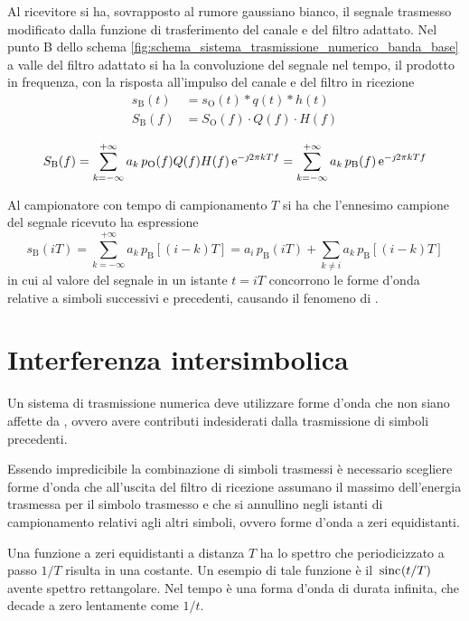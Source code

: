 Al ricevitore si ha, sovrapposto al rumore gaussiano bianco, il segnale trasmesso modificato dalla funzione di trasferimento del canale e del filtro adattato. Nel punto B dello schema \ref{fig:schema_sistema_trasmissione_numerico_banda_base} a valle del filtro adattato si ha la convoluzione del segnale nel tempo, il prodotto in frequenza, con la risposta all'impulso del canale e del filtro in ricezione
\begin{equation}
\begin{split}
s_\text{B}(t)&=s_\text{O}(t)\ast q(t)\ast h(t) \\
S_\text{B}(f)&=S_\text{O}(f)\cdot Q(f)\cdot H(f)
\end{split}
\end{equation}

\begin{equation}
S_\text{B}(f)=\sum_{k=-\infty}^{+\infty}{a_k\, p_\text{O}(f)Q(f)H(f)\operatorname{e}^{-\jmath 2\pi k T f}}=\sum_{k=-\infty}^{+\infty}{a_k\,p_\text{B}(f)\operatorname{e}^{-\jmath 2\pi k T f}}
\end{equation}

Al campionatore con tempo di campionamento $T$ si ha che l'ennesimo campione del segnale ricevuto ha espressione
\begin{equation}
s_\text{B}(i T)=\sum_{k=-\infty}^{+\infty}{a_k\,p_\text{B}[(i-k)T]}=a_i\,p_\text{B}(i T)+\sum_{k\neq i}{a_k\,p_\text{B}[(i-k)T]}
\label{eq:interferenza_intersimbolica}
\end{equation}
in cui al valore del segnale in un istante $t=i T$ concorrono le forme d'onda relative a simboli successivi e precedenti, causando il fenomeno di .

\section{Interferenza intersimbolica}
Un sistema di trasmissione numerica deve utilizzare forme d'onda che non siano affette da , ovvero avere contributi indesiderati dalla trasmissione di simboli precedenti.

Essendo impredicibile la combinazione di simboli trasmessi è necessario scegliere forme d'onda che all'uscita del filtro di ricezione assumano il massimo dell'energia trasmessa per il simbolo trasmesso e che si annullino negli istanti di campionamento relativi agli altri simboli, ovvero forme d'onda a zeri equidistanti.

Una funzione a zeri equidistanti a distanza $T$ ha lo spettro che periodicizzato a passo $1/T$ risulta in una costante. Un esempio di tale funzione è il $\,{\operatorname{sinc}}^{}\!\left({t/T}\right)$ avente spettro rettangolare. Nel tempo è una forma d'onda di durata infinita, che decade a zero lentamente come $1/t$.

